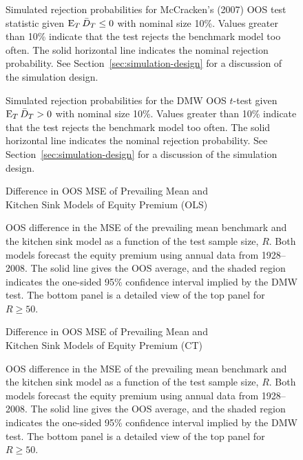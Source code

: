 \documentclass[12pt]{article}
\begin{document}
\begin{figure}
  \caption{Simulated rejection probabilities for McCracken's (2007)
    OOS test statistic given $\operatorname{E}_T \bar{D}_{T} \leq 0$ with
    nominal size 10\%.  Values greater than 10\% indicate that the
    test rejects the benchmark model too often.  The solid horizontal
    line indicates the nominal rejection probability.  See
    Section~\ref{sec:simulation-design} for a discussion of the
    simulation design.}
  \label{fig:mccracken}
\end{figure}

\begin{figure}
   
  \caption{Simulated rejection probabilities for the DMW
    OOS $t$-test given $\operatorname{E}_T \bar{D}_{T} > 0$ with nominal
    size 10\%.  Values greater than 10\% indicate that the test
    rejects the benchmark model too often.  The solid horizontal line
    indicates the nominal rejection probability.  See
    Section~\ref{sec:simulation-design} for a discussion of the
    simulation design.}
  \label{fig:ttest-power}
\end{figure}

\begin{figure}
\centering
\large{Difference in OOS MSE of Prevailing Mean and\\ Kitchen
    Sink Models of Equity Premium (OLS)}
\caption{OOS difference in the MSE
  of the prevailing mean benchmark and the kitchen sink model as a
  function of the test sample size, $R$.  Both models forecast the
  equity premium using annual data from 1928--2008.  The solid line
  gives the OOS average, and the shaded region indicates the
  one-sided 95\% confidence interval implied by the
  DMW test.  The bottom panel is a detailed view of the top
  panel for $R \geq 50$.}
\label{fig:empirics1}
\end{figure}

\begin{figure}
\centering
\large{Difference in OOS MSE of Prevailing Mean and\\ Kitchen
    Sink Models of Equity Premium (CT)}
\caption{OOS difference in the MSE
  of the prevailing mean benchmark and the kitchen sink model as a
  function of the test sample size, $R$.  Both models forecast the
  equity premium using annual data from 1928--2008.  The solid line
  gives the OOS average, and the shaded region indicates the
  one-sided 95\% confidence interval implied by the 
  DMW test.  The bottom panel is a detailed view of the top
  panel for $R \geq 50$.}
\label{fig:empirics2}
\end{figure}
\end{document}
